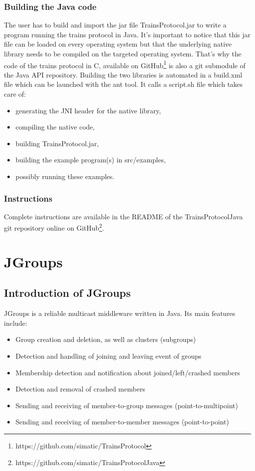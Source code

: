 \documentclass[a4paper,10pt]{report}
\begin{document}
\subsection{Building the Java code}

The user has to build and import the jar file TrainsProtocol.jar to write a program running the trains protocol in Java.
It's important to notice that this jar file can be loaded on every operating system but that the underlying native library needs to be compiled on the targeted operating system.
That's why the code of the trains protocol in C, available on GitHub\footnote{https://github.com/simatic/TrainsProtocol} is also a git submodule of the Java API repository.
Building the two libraries is automated in a build.xml file which can be launched with the ant tool. It calls a script.sh file which takes care of: 
\begin{itemize}
\item generating the JNI header for the native library, 
\item compiling the native code,
\item building TrainsProtocol.jar,
\item building the example program(s) in src/examples,
\item possibly running these examples.
\end{itemize}        



\subsection{Instructions}

Complete instructions are available in the README of the TrainsProtocolJava git repository online on GitHub\footnote{https://github.com/simatic/TrainsProtocolJava}.

\chapter{JGroups}
\section{Introduction of JGroups}
JGroups is a reliable multicast middleware written in Java. Its main features include\cite{jgroups}:

\begin{itemize}
\item     Group creation and deletion, as well as clusters (subgroups)
\item     Detection and handling of joining and leaving event of groups
\item     Membership detection and notification about joined/left/crashed members
\item     Detection and removal of crashed members
\item     Sending and receiving of member-to-group messages (point-to-multipoint)
\item      Sending and receiving of member-to-member messages (point-to-point)
\end{itemize}        
\end{document}
